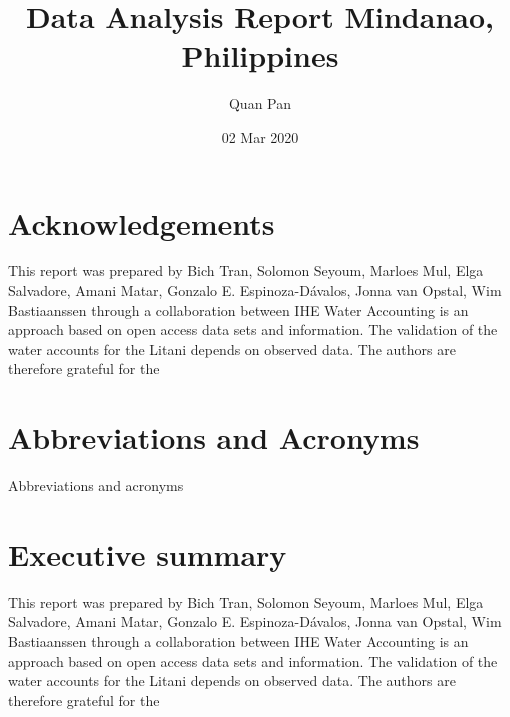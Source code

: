 \documentclass{article}%
\title{Data Analysis Report Mindanao, Philippines}%
\author{Quan Pan}%
\date{02 Mar 2020}%
\begin{document}
%
\normalsize%
\pagestyle{CoverPage}%
\cleardoublepage%
\newpage%
\pagestyle{FirstPage}%
\cleardoublepage%
\newpage%
\pagestyle{TOCPage}%
\cleardoublepage%
\clearpage%
%
\setcounter{page}{1}%
\pagestyle{PreambleHeader}%
\newpage%
\listoffigures%
%
\cleardoublepage%
\newpage%
\listoftables%
%
\cleardoublepage%
\newpage%
\RaggedRight%
\section*{Acknowledgements}%
\label{sec:Acknowledgements}%
This report was prepared by Bich Tran, Solomon Seyoum, Marloes Mul, Elga Salvadore, Amani Matar, Gonzalo E. Espinoza{-}Dávalos, Jonna van Opstal, Wim Bastiaanssen through a collaboration between IHE%
\linebreak%
Water Accounting is an approach based on open access data sets and information. The validation of the water accounts for the Litani depends on observed data. The authors are therefore grateful for the%
\linebreak

%
%
\newpage%
\RaggedRight%
\section*{Abbreviations and Acronyms}%
\label{sec:AbbreviationsandAcronyms}%
Abbreviations and acronyms%
\linebreak

%
%
\newpage%
\RaggedRight%
\section*{Executive summary}%
\label{sec:Executivesummary}%
This report was prepared by Bich Tran, Solomon Seyoum, Marloes Mul, Elga Salvadore, Amani Matar, Gonzalo E. Espinoza{-}Dávalos, Jonna van Opstal, Wim Bastiaanssen through a collaboration between IHE%
\linebreak%
Water Accounting is an approach based on open access data sets and information. The validation of the water accounts for the Litani depends on observed data. The authors are therefore grateful for the%
\linebreak

%
%
\cleardoublepage%
\clearpage%
%
\setcounter{page}{1}%
\pagestyle{SectionHeader}%
\newpage%
\RaggedRight%
\end{document}
